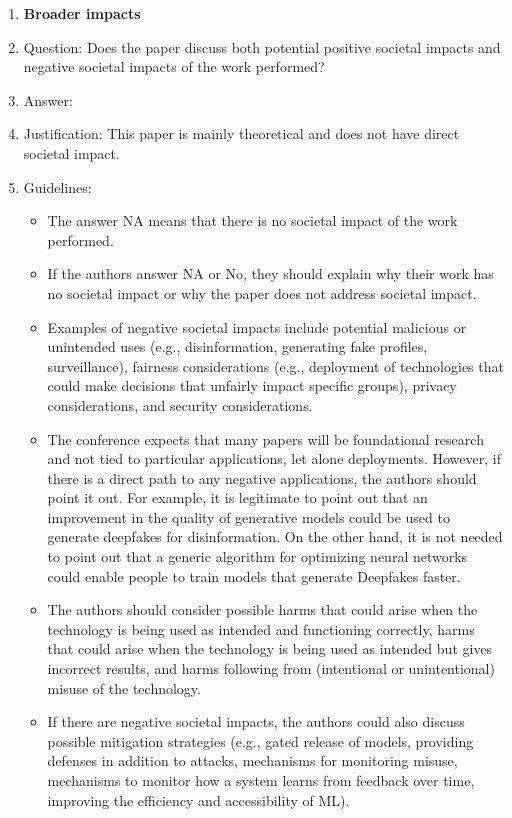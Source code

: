 \documentclass{article}
\begin{document}
{\begin{enumerate}
\item {\bf Broader impacts}
    \item[] Question: Does the paper discuss both potential positive societal impacts and negative societal impacts of the work performed?
    \item[] Answer: \answerNA{} %
    \item[] Justification: This paper is mainly theoretical and does not have direct societal impact.
    \item[] Guidelines:
    \begin{itemize}
        \item The answer NA means that there is no societal impact of the work performed.
        \item If the authors answer NA or No, they should explain why their work has no societal impact or why the paper does not address societal impact.
        \item Examples of negative societal impacts include potential malicious or unintended uses (e.g., disinformation, generating fake profiles, surveillance), fairness considerations (e.g., deployment of technologies that could make decisions that unfairly impact specific groups), privacy considerations, and security considerations.
        \item The conference expects that many papers will be foundational research and not tied to particular applications, let alone deployments. However, if there is a direct path to any negative applications, the authors should point it out. For example, it is legitimate to point out that an improvement in the quality of generative models could be used to generate deepfakes for disinformation. On the other hand, it is not needed to point out that a generic algorithm for optimizing neural networks could enable people to train models that generate Deepfakes faster.
        \item The authors should consider possible harms that could arise when the technology is being used as intended and functioning correctly, harms that could arise when the technology is being used as intended but gives incorrect results, and harms following from (intentional or unintentional) misuse of the technology.
        \item If there are negative societal impacts, the authors could also discuss possible mitigation strategies (e.g., gated release of models, providing defenses in addition to attacks, mechanisms for monitoring misuse, mechanisms to monitor how a system learns from feedback over time, improving the efficiency and accessibility of ML).
    \end{itemize}
    

\end{enumerate}}
\end{document}
